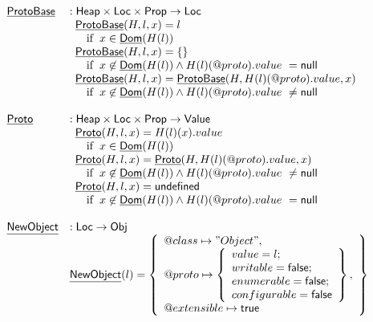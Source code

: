 \[
\begin{array}{ll}
\chf{ProtoBase} & : \SF{Heap} \times \SF{Loc} \times \SF{Prop} \rightarrow \SF{Loc}\\
& 
\begin{array}{ll}
  \chf{ProtoBase}(H,l,x) = l &\\
    \quad\ifc{x\in\chf{Dom}(H(l))}&\\
  \chf{ProtoBase}(H,l,x) = \{ \} &\\
    \quad\ifc{x\not\in\chf{Dom}(H(l)) \land H(l)(\varprop{proto}).value\ = \SF{null}}&\\
  \chf{ProtoBase}(H,l,x) =  \chf{ProtoBase}(H,H(l)(\varprop{proto}).value,x) &\\
    \quad\ifc{x\not\in\chf{Dom}(H(l)) \land H(l)(\varprop{proto}).value\ \neq \SF{null}}&\\
\end{array}\\
\\
\chf{Proto} & : \SF{Heap} \times \SF{Loc} \times \SF{Prop} \rightarrow \SF{Value}\\
& 
\begin{array}{ll}
  \chf{Proto}(H,l,x) =  H(l)(x).value &\\
    \quad\ifc{x\in\chf{Dom}(H(l))}&\\
  \chf{Proto}(H,l,x) =  \chf{Proto}(H,H(l)(\varprop{proto}).value,x) &\\
    \quad\ifc{ x\not\in\chf{Dom}(H(l)) \land H(l)(\varprop{proto}).value\ \neq \SF{null}}\\
  \chf{Proto}(H,l,x) = \SF{undefined} &\\
    \quad\ifc{ x\not\in\chf{Dom}(H(l)) \land H(l)(\varprop{proto}).value\ = \SF{null}}\\
\end{array}\\
\\
\chf{NewObject} & : \SF{Loc} \rightarrow \SF{Obj} \\
& \chf{NewObject}(l) = \set{\varprop{class}\mapsto "Object",\\
  \varprop{proto}\mapsto
  \set{
    value=l;\\writable=\vfalse;\\
    enumerable=\vfalse;\\configurable=\vfalse\\
    },\\
  \varprop{extensible}\mapsto \vtrue}\\\\


\end{array}\]
